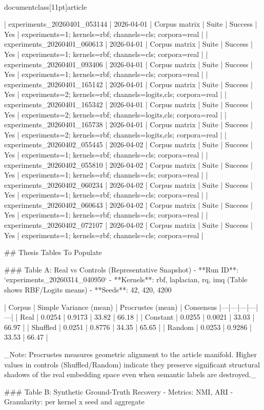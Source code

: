 \\documentclass[11pt]{article}
\begin{document}
\begin{CodeBlock}
| experiments_20260401_053144 | 2026-04-01 | Corpus matrix | Suite | Success | Yes | experiments=1; kernels=rbf; channels=cls; corpora=real |
| experiments_20260401_060613 | 2026-04-01 | Corpus matrix | Suite | Success | Yes | experiments=1; kernels=rbf; channels=cls; corpora=real |
| experiments_20260401_093406 | 2026-04-01 | Corpus matrix | Suite | Success | Yes | experiments=1; kernels=rbf; channels=cls; corpora=real |
| experiments_20260401_165142 | 2026-04-01 | Corpus matrix | Suite | Success | Yes | experiments=2; kernels=rbf; channels=logits,cls; corpora=real |
| experiments_20260401_165342 | 2026-04-01 | Corpus matrix | Suite | Success | Yes | experiments=2; kernels=rbf; channels=logits,cls; corpora=real |
| experiments_20260401_165738 | 2026-04-01 | Corpus matrix | Suite | Success | Yes | experiments=2; kernels=rbf; channels=logits,cls; corpora=real |
| experiments_20260402_055445 | 2026-04-02 | Corpus matrix | Suite | Success | Yes | experiments=1; kernels=rbf; channels=cls; corpora=real |
| experiments_20260402_055810 | 2026-04-02 | Corpus matrix | Suite | Success | Yes | experiments=1; kernels=rbf; channels=cls; corpora=real |
| experiments_20260402_060234 | 2026-04-02 | Corpus matrix | Suite | Success | Yes | experiments=1; kernels=rbf; channels=cls; corpora=real |
| experiments_20260402_060643 | 2026-04-02 | Corpus matrix | Suite | Success | Yes | experiments=1; kernels=rbf; channels=cls; corpora=real |
| experiments_20260402_072107 | 2026-04-02 | Corpus matrix | Suite | Success | Yes | experiments=1; kernels=rbf; channels=cls; corpora=real |

## Thesis Tables To Populate

### Table A: Real vs Controls (Representative Snapshot)
- **Run ID**: `experiments_20260314_040950`
- **Kernels**: rbf, laplacian, rq, imq (Table shows RBF/Logits means)
- **Seeds**: 42, 420, 4200

| Corpus | Simple Variance (mean) | Procrustes (mean) | Consensus %
|---|---|---|---|---|
| Real | 0.0254 | 0.9173 | 33.82 | 66.18 |
| Constant | 0.0255 | 0.0021 | 33.03 | 66.97 |
| Shuffled | 0.0251 | 0.8776 | 34.35 | 65.65 |
| Random | 0.0253 | 0.9286 | 33.53 | 66.47 |

_Note: Procrustes measures geometric alignment to the article manifold. Higher values in controls (Shuffled/Random) indicate they preserve significant structural shadows of the real embedding space even when semantic labels are destroyed._

### Table B: Synthetic Ground-Truth Recovery
- Metrics: NMI, ARI
- Granularity: per kernel x seed and aggregate


\end{CodeBlock}
\end{document}
